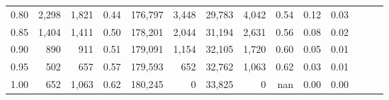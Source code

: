 \begin{tabular}{rrrrrrrrrrrrrr}
0.80 &   2,298 &  1,821 &  0.44 &  176,797 &    3,448 &  29,783 &   4,042 &  0.54 &  0.12 &      0.03 \\
0.85 &   1,404 &  1,411 &  0.50 &  178,201 &    2,044 &  31,194 &   2,631 &  0.56 &  0.08 &      0.02 \\
0.90 &     890 &    911 &  0.51 &  179,091 &    1,154 &  32,105 &   1,720 &  0.60 &  0.05 &      0.01 \\
0.95 &     502 &    657 &  0.57 &  179,593 &      652 &  32,762 &   1,063 &  0.62 &  0.03 &      0.01 \\
1.00 &     652 &  1,063 &  0.62 &  180,245 &        0 &  33,825 &       0 &   nan &  0.00 &      0.00 \\
\bottomrule
\end{tabular}

